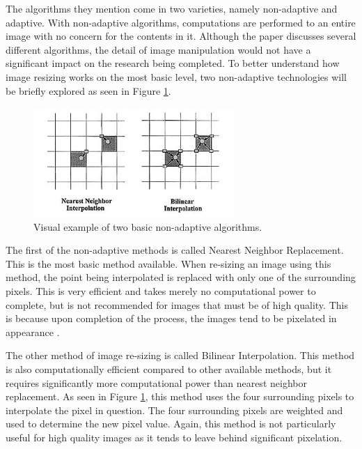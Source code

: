 The algorithms they mention come in two varieties, namely non-adaptive and adaptive. With non-adaptive algorithms, computations are performed to an entire image with no concern for the contents in it. Although the paper discusses several different algorithms, the detail of image manipulation would not have a significant impact on the research being completed. To better understand how image resizing works on the most basic level, two non-adaptive technologies will be briefly explored as seen in Figure \ref{interpolation}.

\begin{figure}[htbp]
\centering
\includegraphics[width=3in]{interpolation}
\caption{Visual example of two basic non-adaptive algorithms.}
\label{interpolation}
\end{figure}

The first of the non-adaptive methods is called Nearest Neighbor Replacement. This is the most basic method available. When re-sizing an image using this method, the point being interpolated is replaced with only one of the surrounding pixels. This is very efficient and takes merely no computational power to complete, but is not recommended for images that must be of high quality. This is because upon completion of the process, the images tend to be pixelated in appearance \cite{Acharya:2007}.

The other method of image re-sizing is called Bilinear Interpolation. This method is also computationally efficient compared to other available methods, but it requires significantly more computational power than nearest neighbor replacement. As seen in Figure \ref{interpolation}, this method uses the four surrounding pixels to interpolate the pixel in question. The four surrounding pixels are weighted and used to determine the new pixel value. Again, this method is not particularly useful for high quality images as it tends to leave behind significant pixelation.

